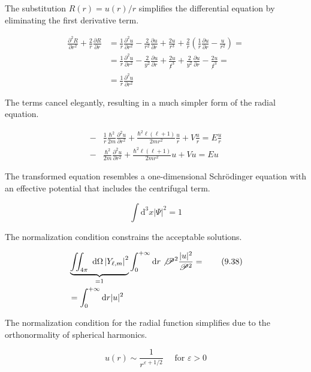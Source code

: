 \documentclass[italian]{HKNdocument}
\begin{document}
The substitution $R(r) = u(r)/r$ simplifies the differential equation by eliminating the first derivative term.

\begin{align*}
\frac{\partial^{2} R}{\partial r^{2}}+\frac{2}{r} \frac{\partial R}{\partial r} & =\frac{1}{r} \frac{\partial^{2} u}{\partial r^{2}}-\frac{2}{r^{2}} \frac{\partial u}{\partial r}+\frac{2 u}{r^{3}}+\frac{2}{r}\left(\frac{1}{r} \frac{\partial u}{\partial r}-\frac{u}{r^{2}}\right)= \\
& =\frac{1}{r} \frac{\partial^{2} u}{\partial r^{2}}-\frac{2}{y^{2}} \frac{\partial u}{\partial r}+\frac{2 u}{\not r^{3}}+\frac{2}{y^{2}} \frac{\partial u}{\partial r}-\frac{2 u}{\not r^{3}}=  \tag{9.35}\\
& =\frac{1}{r} \frac{\partial^{2} u}{\partial r^{2}}
\end{align*}

The terms cancel elegantly, resulting in a much simpler form of the radial equation.

\begin{align*}
- & \frac{1}{r} \frac{\hbar^{2}}{2 m} \frac{\partial^{2} u}{\partial r^{2}}+\frac{\hbar^{2} \ell(\ell+1)}{2 m r^{2}} \frac{u}{r}+V \frac{u}{r}=E \frac{u}{r}  \tag{9.36}\\
- & \frac{\hbar^{2}}{2 m} \frac{\partial^{2} u}{\partial r^{2}}+\frac{\hbar^{2} \ell(\ell+1)}{2 m r^{2}} u+V u=E u
\end{align*}

The transformed equation resembles a one-dimensional Schrödinger equation with an effective potential that includes the centrifugal term.

\begin{equation*}
\int \mathrm{d}^{3} x|\Psi|^{2}=1 \tag{9.37}
\end{equation*}

The normalization condition constrains the acceptable solutions.

\begin{align*}
& \underbrace{\iint_{4 \pi} \mathrm{~d} \Omega\left|Y_{\ell, m}\right|^{2}}_{=1} \int_{0}^{+\infty} \mathrm{d} r \not \mathscr{P}^{2} \frac{|u|^{2}}{\mathscr{P}^{2}}=  \tag{9.38}\\
& =\int_{0}^{+\infty} \mathrm{d} r|u|^{2}
\end{align*}

The normalization condition for the radial function simplifies due to the orthonormality of spherical harmonics.

\begin{equation*}
u(r) \sim \frac{1}{r^{\varepsilon+1 / 2}} \quad \text { for } \varepsilon>0 \tag{9.39}
\end{equation*}
\end{document}
